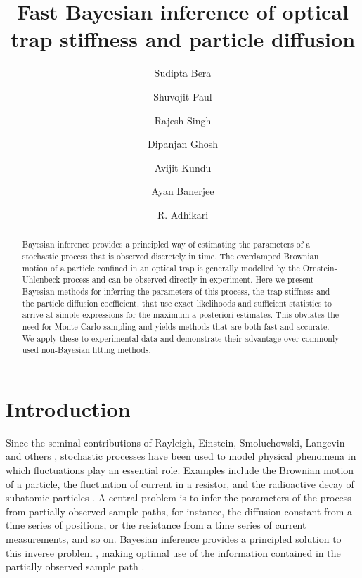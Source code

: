 \documentclass[fleqn,10pt]{wlscirep}
\begin{document}
\title{Fast Bayesian inference of optical trap stiffness and particle diffusion}

\author[1]{Sudipta Bera}
\author[1]{Shuvojit Paul}
\author[2]{Rajesh Singh}
\author[3]{Dipanjan Ghosh}
\author[1]{Avijit Kundu}
\author[1,*]{Ayan Banerjee}
\author[2,+]{R. Adhikari}



\begin{abstract}
Bayesian inference provides a principled way of estimating the parameters
of a stochastic process that is observed discretely in time. The overdamped
Brownian motion of a particle confined in an optical trap is generally
modelled by the Ornstein-Uhlenbeck process and can be observed directly
in experiment. Here we present Bayesian methods for inferring the
parameters of this process, the trap stiffness and the particle diffusion
coefficient, that use exact likelihoods and sufficient statistics
to arrive at simple expressions for the maximum a posteriori estimates.
This obviates the need for Monte Carlo sampling and yields methods
that are both fast and accurate. We apply these to experimental data
and demonstrate their advantage over commonly used non-Bayesian fitting
methods. 
\end{abstract}
\flushbottom
\maketitle

\section*{Introduction}
Since the seminal contributions of Rayleigh, Einstein, Smoluchowski,
Langevin and others \cite{chandrasekhar1943stochastic}, stochastic
processes have been used to model physical phenomena in which fluctuations
play an essential role. Examples include the Brownian motion of a
particle, the fluctuation of current in a resistor, and the radioactive
decay of subatomic particles \cite{van1992stochastic}. A central
problem is to infer the parameters of the process from partially observed
sample paths, for instance, the diffusion constant from a time series
of positions, or the resistance from a time series of current measurements,
and so on. Bayesian inference provides a principled solution to this
inverse problem \cite{jeffreys1998theory}, making optimal use of
the information contained in the partially observed sample path \cite{zellner1988optimal}. 
\end{document}
